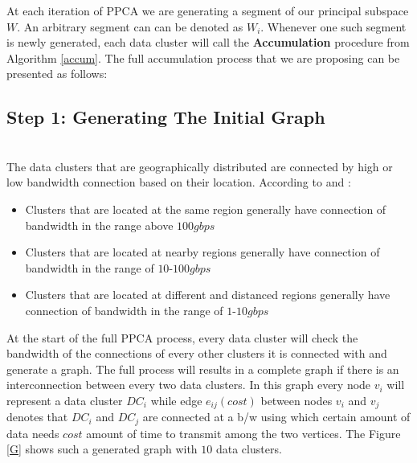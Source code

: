 \documentclass[12pt,notitlepage,oneside]{report}
\begin{document}
At each iteration of PPCA we are generating a segment of our principal subspace $W$. An arbitrary segment can can be denoted as $W_i$. Whenever one such segment is newly generated, each data cluster will call the \textbf{Accumulation} procedure from Algorithm \ref{accum}. The full accumulation process that we are proposing can be presented as follows:

\subsection{\textbf{Step 1: Generating The Initial Graph}}\hspace*{\fill} \\
The data clusters that are geographically distributed are connected by high or low bandwidth connection based on their location. According to \cite{nokia} and \cite{fujitsu}:
\begin{itemize}
\item Clusters that are located at the same region  generally have connection of bandwidth in the range above $100gbps$ 
\item Clusters that are located at nearby regions  generally have connection of bandwidth in the range of $10$-$100gbps$ 
\item Clusters that are located at different and distanced regions  generally have connection of bandwidth in the range of $1$-$10gbps$ 
\end{itemize}
At the start of the full PPCA process, every data cluster will check the bandwidth of the  connections of every other clusters it is connected with and generate a graph. The full process will results in a complete graph if there is an interconnection between every two data clusters. In this graph every node $v_i$ will represent a data cluster $DC_i$ while edge $e_{ij}(cost)$ between nodes  $v_i$ and  $v_j$ denotes that   $DC_i$ and $DC_j$ are connected at a b/w using which certain amount of data needs $cost$ amount of time to transmit among the two vertices. The Figure \ref{G} shows such a generated graph with $10$ data clusters.
\end{document}
